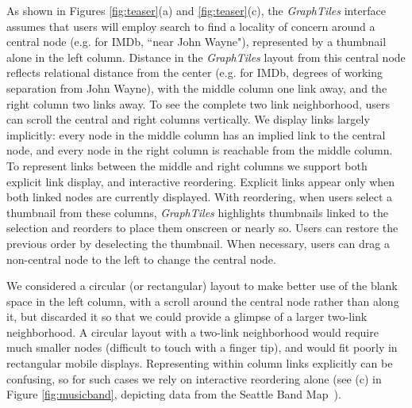 As shown in Figures \ref{fig:teaser}(a) and \ref{fig:teaser}(c), the \textit{GraphTiles} interface assumes that users will employ search to find a locality of concern around a central node (e.g. for IMDb, ``near John Wayne"), represented by a thumbnail alone in the left column. Distance in the \textit{GraphTiles} layout from this central node reflects relational distance from the center (e.g. for IMDb, degrees of working separation from John Wayne), with the middle column one link away, and the right column two links away. To see the complete two link neighborhood, users can scroll the central and right columns vertically. We display links largely implicitly: every node in the middle column has an implied link to the central node, and every node in the right column is reachable from the middle column. To represent links between the middle and right columns we support both explicit link display, and interactive reordering. Explicit links appear only when both linked nodes are currently displayed. With reordering, when users select a thumbnail from these columns, \textit{GraphTiles} highlights thumbnails linked to the selection and reorders to place them onscreen or nearly so. Users can restore the previous order by deselecting the thumbnail. When necessary, users can drag a non-central node to the left to change the central node.

We considered a circular (or rectangular) layout to make better use of the blank space in the left column, with a scroll around the central node rather than along it, but discarded it so that we could provide a glimpse of a larger two-link neighborhood. A circular layout with a two-link neighborhood would require much smaller nodes (difficult to touch with a finger tip), and would fit poorly in rectangular mobile displays. Representing within column links explicitly can be confusing, so for such cases we rely on interactive reordering alone (see (c) in Figure \ref{fig:musicband}, depicting data from the Seattle Band Map~\cite{seattleband}).
